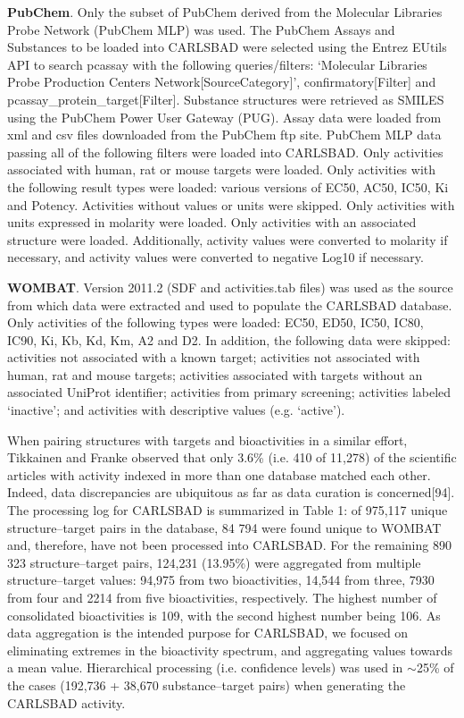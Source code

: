 \textbf{PubChem}. Only the subset of PubChem derived from the Molecular Libraries Probe Network (PubChem MLP) was used. The PubChem Assays and Substances to be loaded into CARLSBAD were selected using the Entrez EUtils API to search pcassay with the following queries/filters: ‘Molecular Libraries Probe Production Centers Network[SourceCategory]’, confirmatory[Filter] and pcassay\_protein\_target[Filter]. Substance structures were retrieved as SMILES using the PubChem Power User Gateway (PUG). Assay data were loaded from xml and csv files downloaded from the PubChem ftp site. PubChem MLP data passing all of the following filters were loaded into CARLSBAD. Only activities associated with human, rat or mouse targets were loaded. Only activities with the following result types were loaded: various versions of EC50, AC50, IC50, Ki and Potency. Activities without values or units were skipped. Only activities with units expressed in molarity were loaded. Only activities with an associated structure were loaded. Additionally, activity values were converted to molarity if necessary, and activity values were converted to negative Log10 if necessary.

\textbf{WOMBAT}. Version 2011.2 (SDF and activities.tab files) was used as the source from which data were extracted and used to populate the CARLSBAD database. Only activities of the following types were loaded: EC50, ED50, IC50, IC80, IC90, Ki, Kb, Kd, Km, A2 and D2. In addition, the following data were skipped: activities not associated with a known target; activities not associated with human, rat and mouse targets; activities associated with targets without an associated UniProt identifier; activities from primary screening; activities labeled ‘inactive’; and activities with descriptive values (e.g. ‘active’).

When pairing structures with targets and bioactivities in a similar effort, Tikkainen and Franke observed that only 3.6\% (i.e. 410 of 11,278) of the scientific articles with activity indexed in more than one database matched each other. Indeed, data discrepancies are ubiquitous as far as data curation is concerned[94]. The processing log for CARLSBAD is summarized in Table 1: of 975,117 unique structure–target pairs in the database, 84 794 were found unique to WOMBAT and, therefore, have not been processed into CARLSBAD. For the remaining 890 323 structure–target pairs, 124,231 (13.95\%) were aggregated from multiple structure–target values: 94,975 from two bioactivities, 14,544 from three, 7930 from four and 2214 from five bioactivities, respectively. The highest number of consolidated bioactivities is 109, with the second highest number being 106. As data aggregation is the intended purpose for CARLSBAD, we focused on eliminating extremes in the bioactivity spectrum, and aggregating values towards a mean value. Hierarchical processing (i.e. confidence levels) was used in $\sim$25\% of the cases (192,736 + 38,670 substance–target pairs) when generating the CARLSBAD activity.

